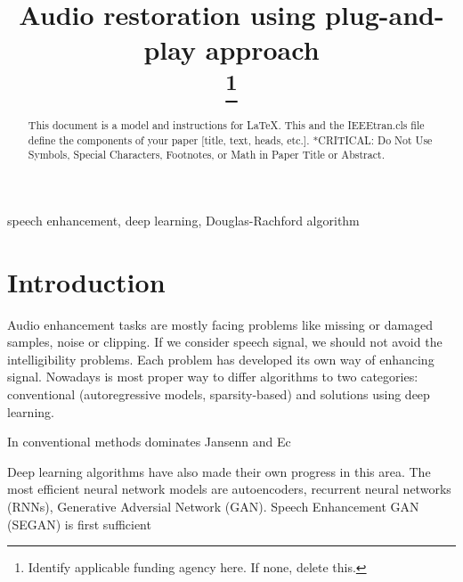 \documentclass[conference]{IEEEtran}
\begin{document}
\title{Audio restoration using plug-and-play approach\\
{}
\thanks{Identify applicable funding agency here. If none, delete this.}
}

\author{
\and
{}

}

\maketitle

\begin{abstract}
This document is a model and instructions for \LaTeX.
This and the IEEEtran.cls file define the components of your paper [title, text, heads, etc.]. *CRITICAL: Do Not Use Symbols, Special Characters, Footnotes, 
or Math in Paper Title or Abstract.
\end{abstract}

\begin{IEEEkeywords}
speech enhancement, deep learning, Douglas-Rachford algorithm
\end{IEEEkeywords}

\section{Introduction}

Audio enhancement tasks are mostly facing problems like missing or damaged samples, noise or clipping.
If we consider speech signal, we should not avoid the intelligibility problems.
Each problem has developed its own way of enhancing signal.
Nowadays is most proper way to differ algorithms to two categories:
conventional (autoregressive models, sparsity-based) and solutions using deep learning.

In conventional methods dominates Jansenn and Ec


Deep learning algorithms have also made their own progress in this area.
The most efficient neural network models are autoencoders,
recurrent neural networks (RNNs),
Generative Adversial Network (GAN).
Speech Enhancement GAN (SEGAN) is first sufficient\cite{Pascual2017}
\end{document}
